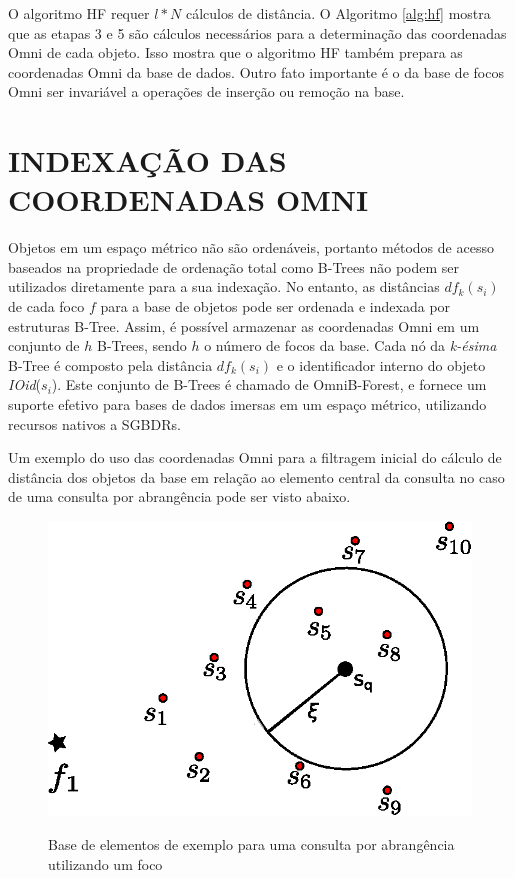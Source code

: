 O algoritmo HF requer $l*N$ cálculos de distância. O Algoritmo \ref{alg:hf} mostra que as etapas 3 e 5 são cálculos
necessários para a determinação das coordenadas Omni de cada objeto. Isso mostra que o algoritmo HF também prepara as
coordenadas Omni da base de dados. Outro fato importante é o da base de focos Omni ser invariável a operações de inserção
ou remoção na base.

\section{INDEXAÇÃO DAS COORDENADAS OMNI}
\label{sec:indexomni}

Objetos em um espaço métrico não são ordenáveis, portanto métodos de acesso baseados na propriedade de ordenação total
como B-Trees não podem ser utilizados diretamente para a sua indexação. No entanto, as distâncias $df_k(s_i)$ de cada foco
$f$ para a base de objetos pode ser ordenada e indexada por estruturas B-Tree. Assim, é possível armazenar as coordenadas Omni
em um conjunto de $h$ B-Trees, sendo $h$ o número de focos da base. Cada nó da \textit{k-ésima} B-Tree é composto pela distância $df_k(s_i)$
e o identificador interno do objeto \textit{IOid}($s_i$). Este conjunto de B-Trees é chamado de OmniB-Forest, e fornece 
um suporte efetivo para bases de dados imersas em um espaço métrico, utilizando recursos nativos a SGBDRs.\par

Um exemplo do uso das coordenadas Omni para a filtragem inicial do cálculo de distância dos objetos da base em relação ao elemento central da consulta no caso de uma consulta por
abrangência pode ser visto abaixo.

\begin{figure}[H]
\centering
\caption{Base de elementos de exemplo para uma consulta por abrangência utilizando um foco}
\includegraphics[width=.55\textwidth]{dados/figuras/rg_ex1.eps}
\label{fig:rgex1}
\end{figure}

